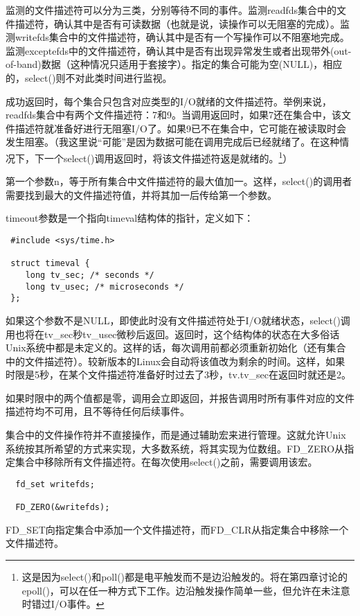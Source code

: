 监测的文件描述符可以分为三类，分别等待不同的事件。监测readfds集合中的文件描述符，确认其中是否有可读数据（也就是说，读操作可以无阻塞的完成）。监测writefds集合中的文件描述符，确认其中是否有一个写操作可以不阻塞地完成。监测exceptefds中的文件描述符，确认其中是否有出现异常发生或者出现带外(out-of-band)数据（这种情况只适用于套接字）。指定的集合可能为空(NULL)，相应的，select()则不对此类时间进行监视。

成功返回时，每个集合只包含对应类型的I/O就绪的文件描述符。举例来说，readfds集合中有两个文件描述符：7和9。当调用返回时，如果7还在集合中，该文件描述符就准备好进行无阻塞I/O了。如果9已不在集合中，它可能在被读取时会发生阻塞。（我这里说“可能”是因为数据可能在调用完成后已经就绪了。在这种情况下，下一个select()调用返回时，将该文件描述符返是就绪的。\footnote[1]{这是因为select()和poll()都是电平触发而不是边沿触发的。将在第四章讨论的epoll()，可以在任一种方式下工作。边沿触发操作简单一些，但允许在未注意时错过I/O事件。}）

第一个参数n，等于所有集合中文件描述符的最大值加一。这样，select()的调用者需要找到最大的文件描述符值，并将其加一后传给第一个参数。

timeout参数是一个指向timeval结构体的指针，定义如下： 

\begin{lstlisting}
 #include <sys/time.h>

 struct timeval {
	long tv_sec; /* seconds */
	long tv_usec; /* microseconds */
 };
\end{lstlisting}

如果这个参数不是NULL，即使此时没有文件描述符处于I/O就绪状态，select()调用也将在tv\_sec秒tv\_usec微秒后返回。返回时，这个结构体的状态在大多俗话Unix系统中都是未定义的。这样的话，每次调用前都必须重新初始化（还有集合中的文件描述符）。较新版本的Linux会自动将该值改为剩余的时间。这样，如果时限是5秒，在某个文件描述符准备好时过去了3秒，tv.tv\_sec在返回时就还是2。

如果时限中的两个值都是零，调用会立即返回，并报告调用时所有事件对应的文件描述符均不可用，且不等待任何后续事件。

集合中的文件操作符并不直接操作，而是通过辅助宏来进行管理。这就允许Unix系统按其所希望的方式来实现，大多数系统，将其实现为位数组。FD\_ZERO从指定集合中移除所有文件描述符。在每次使用select()之前，需要调用该宏。 

\begin{lstlisting}
  fd_set writefds;
 
  FD_ZERO(&writefds);
\end{lstlisting}

FD\_SET向指定集合中添加一个文件描述符，而FD\_CLR从指定集合中移除一个文件描述符。 


